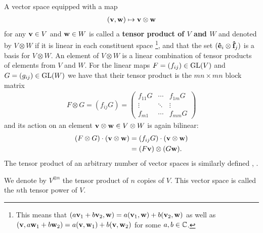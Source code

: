 A vector space equipped with a map
\begin{align*}
	(\mathbf{v}, \mathbf{w}) \mapsto \mathbf{v} \otimes \mathbf{w}
\end{align*}
for any $\mathbf{v} \in V$ and $\mathbf{w} \in W$ is called a \textbf{tensor product of $V$ and $W$} and denoted by $V \otimes W$ if it is linear in each constituent space \footnote{This means that $(a\mathbf{v}_1 + b\mathbf{v}_2, \mathbf{w}) =  a(\mathbf{v}_1, \mathbf{w}) + b(\mathbf{v}_2, \mathbf{w})$ as well as 
	$(\mathbf{v}, a\mathbf{w}_1 + b\mathbf{w}_2) = a(\mathbf{v}, \mathbf{w}_1) + b(\mathbf{v}, \mathbf{w}_2)$ for some $a,b \in \mathbb{C}$.
	}, and that the set $(\mathbf{\hat{e}}_i \otimes \mathbf{\hat{f}}_j)$ is a basis for $V \otimes W$. An element of $V \otimes W$ is a linear combination of tensor products of elements from $V$ and $W$. For the linear maps $F=(f_{ij}) \in \text{GL}(V)$ and $G=(g_{ij}) \in \text{GL}(W)$ we have that their tensor product is the $mn \times mn$ block matrix
\begin{align*}
		F \otimes G = (f_{ij}G) = \begin{pmatrix}
				f_{11}G & \cdots & f_{1m}G  \\
				\vdots & \ddots & \vdots \\
				f_{m1} & \cdots & f_{mm}G
			\end{pmatrix}
	\end{align*}
and its action on an element $\mathbf{v} \otimes \mathbf{w} \in V \otimes W$ is again bilinear:
\begin{align*}
		(F \otimes G) \cdot (\mathbf{v} \otimes \mathbf{w}) &= (f_{ij}G)  \cdot (\mathbf{v} \otimes \mathbf{w})  \\
		&= (F\mathbf{v}) \otimes (G\mathbf{w}).
	\end{align*} The tensor product of an arbitrary number of vector spaces is similarly defined \cite[Sect.1.5.]{Serre}, \cite[Sect.1.7.]{Sagan}.
	
\begin{notation}
	We denote by $V^{\otimes n}$ the tensor product of $n$ copies of $V$. This vector space is called the $n$th tensor power of $V$.
\end{notation}

